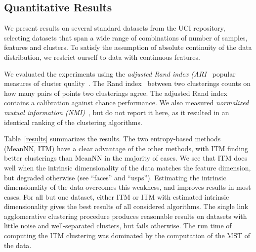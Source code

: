 \subsection{Quantitative Results}
We present results on several standard datasets from the UCI repository, 
selecting datasets that span a wide range of combinations of number
of samples, features and clusters.
To satisfy the assumption of absolute continuity of the data distribution, 
we restrict ourself to data with continuous features.

We evaluated the experiments using the \emph{adjusted Rand index 
(ARI}~\citep{hubert1985comparing}  popular measures 
of cluster quality~\citep{gomes2010discriminative,kamvar2003spectral}.
The Rand index~\citep{rand1971objective} between two clusterings counts on how
many pairs of points two clusterings agree. The adjusted Rand index contains a
calibration against chance performance.
We also measured \emph{normalized mutual information
(NMI)}~\citep{strehl2003cluster}, but do not report it here, as it resulted in
an identical ranking of the clustering algorithms.

Table~\ref{results} summarizes the results. The two entropy-based methods 
(MeanNN, ITM) have a clear advantage of the other methods, with ITM finding 
better clusterings than MeanNN in the majority of cases.
We see that ITM does well when the intrinsic dimensionality of the data matches
the feature dimension, but degraded otherwise (see ``faces'' and ``usps'').
Estimating the intrinsic dimensionality of the data overcomes this weakness,
and improves results in most cases. For all but one dataset, either ITM or ITM with
estimated intrinsic dimensionality gives the best results of all considered
algorithms.
%
The single link agglomerative clustering procedure produces reasonable 
results on datasets with little noise and well-separated clusters, but 
fails otherwise.
%
The run time of computing the ITM clustering was dominated by the computation
of the MST of the data.
%

